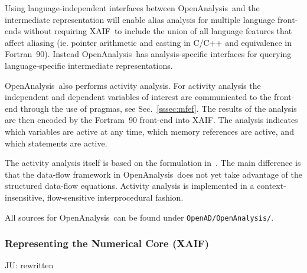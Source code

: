 \documentclass[11pt]{article}
\newcommand{\OpenAnalysis}{OpenAnalysis}
\newcommand{\xaif}{XAIF}
\newcommand{\refsec}[1]{{Sec.~\ref{#1}}}
\begin{document}
Using language-independent interfaces between \OpenAnalysis\ and the
intermediate representation will enable alias analysis for multiple
language front-ends without requiring \xaif\ to include the union of
all language features that affect aliasing (ie. pointer arithmetic and
casting in C/C++ and equivalence in Fortran~90).  Instead
\OpenAnalysis\ has analysis-specific interfaces for querying
language-specific intermediate representations.

\OpenAnalysis\ also performs activity analysis.  For activity analysis
the independent and dependent variables of interest are communicated
to the front-end through the use of pragmas, see \refsec{sssec:mfef}.
The results of the analysis are then encoded by the Fortram~90
front-end into \xaif.  The analysis indicates which variables are
active at any time, which memory references are active, and which
statements are active.

The activity analysis itself is based on the formulation in~\cite{HNP02}.
The main difference is that the data-flow framework in \OpenAnalysis\ does not
yet take advantage of the structured data-flow equations.  Activity analysis is
implemented in a context-insensitive, flow-sensitive interprocedural fashion.

All sources for \OpenAnalysis\ can be found under {\tt OpenAD/OpenAnalysis/}.
\subsubsection{Representing the Numerical Core (\xaif)} \label{sssec:xaif}
{\color{red} JU: rewritten } 
\end{document}

